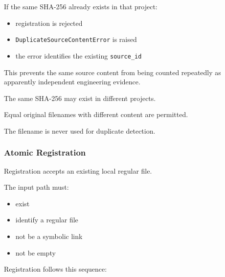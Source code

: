 If the same SHA-256 already exists in that project:

\begin{itemize}
\tightlist
\item
  registration is rejected
\item
  \texttt{DuplicateSourceContentError} is raised
\item
  the error identifies the existing \texttt{source\_id}
\end{itemize}

This prevents the same source content from being counted repeatedly as apparently independent engineering evidence.

The same SHA-256 may exist in different projects.

Equal original filenames with different content are permitted.

The filename is never used for duplicate detection.

\hypertarget{atomic-registration}{%
\subsubsection{Atomic Registration}\label{atomic-registration}}

Registration accepts an existing local regular file.

The input path must:

\begin{itemize}
\tightlist
\item
  exist
\item
  identify a regular file
\item
  not be a symbolic link
\item
  not be empty
\end{itemize}

Registration follows this sequence:


